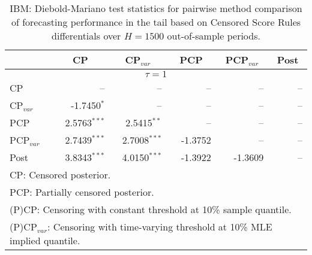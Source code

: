 { \renewcommand{\arraystretch}{1.2} 
\begin{table} 
\center 
\begin{tabular}{l | rrrrr} 
& \multicolumn{1}{c}{CP}& \multicolumn{1}{c}{CP$_{var}$}& \multicolumn{1}{c}{PCP}& \multicolumn{1}{c}{PCP$_{var}$}& \multicolumn{1}{c}{Post} \\ \hline 
\multicolumn{6}{c}{$\tau = 1$} \\ \hline 
CP &    --\phantom{$^{***}$} &    --\phantom{$^{***}$} &    --\phantom{$^{***}$} &    --\phantom{$^{***}$} &    --\phantom{$^{***}$}   \\ 
CP$_{var}$ & -1.7450$^{*}$\phantom{$^{**}$} &    --\phantom{$^{***}$} &    --\phantom{$^{***}$} &    --\phantom{$^{***}$} &    --\phantom{$^{***}$}   \\ 
PCP & 2.5763$^{***}$ & 2.5415$^{**}$\phantom{$^{*}$} &    --\phantom{$^{***}$} &    --\phantom{$^{***}$} &    --\phantom{$^{***}$}   \\ 
PCP$_{var}$ & 2.7439$^{***}$ & 2.7008$^{***}$ & -1.3752\phantom{$^{***}$} &    --\phantom{$^{***}$} &    --\phantom{$^{***}$}   \\ 
Post & 3.8343$^{***}$ & 4.0150$^{***}$ & -1.3922\phantom{$^{***}$} & -1.3609\phantom{$^{***}$} &    --\phantom{$^{***}$}   \\ 
\hline 
\multicolumn{6}{l}{\footnotesize{CP: Censored posterior.}}  \\ 
\multicolumn{6}{l}{\footnotesize{PCP: Partially censored posterior.}} \\ 
\multicolumn{6}{l}{\footnotesize{(P)CP: Censoring with constant threshold at 10\% sample quantile.}}  \\ 
\multicolumn{6}{l}{\footnotesize{(P)CP$_{var}$: Censoring with time-varying threshold at 10\% MLE implied quantile.}} \\ 
\end{tabular}
 \caption{IBM: Diebold-Mariano test statistics for  pairwise method comparison of forecasting performance in the tail based on  Censored Score Rules differentials over $H=1500$ out-of-sample periods. }
\label{tab:IBM_DM_1}  
\end{table}
}